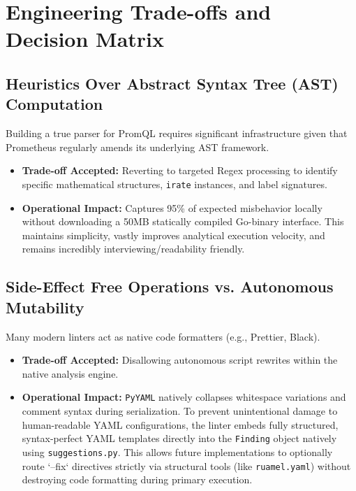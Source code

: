 \documentclass[a4paper,11pt]{article}
\begin{document}
\section{Engineering Trade-offs and Decision Matrix}

\subsection{Heuristics Over Abstract Syntax Tree (AST) Computation}
Building a true parser for PromQL requires significant infrastructure given that Prometheus regularly amends its underlying AST framework.
\begin{itemize}
    \item \textbf{Trade-off Accepted:} Reverting to targeted Regex processing to identify specific mathematical structures, \texttt{irate} instances, and label signatures.
    \item \textbf{Operational Impact:} Captures 95\% of expected misbehavior locally without downloading a 50MB statically compiled Go-binary interface. This maintains simplicity, vastly improves analytical execution velocity, and remains incredibly interviewing/readability friendly.
\end{itemize}

\subsection{Side-Effect Free Operations vs. Autonomous Mutability}
Many modern linters act as native code formatters (e.g., Prettier, Black). 
\begin{itemize}
    \item \textbf{Trade-off Accepted:} Disallowing autonomous script rewrites within the native analysis engine.
    \item \textbf{Operational Impact:} \texttt{PyYAML} natively collapses whitespace variations and comment syntax during serialization. To prevent unintentional damage to human-readable YAML configurations, the linter embeds fully structured, syntax-perfect YAML templates directly into the \texttt{Finding} object natively using \texttt{suggestions.py}. This allows future implementations to optionally route `--fix` directives strictly via structural tools (like \texttt{ruamel.yaml}) without destroying code formatting during primary execution.
\end{itemize}
\end{document}
